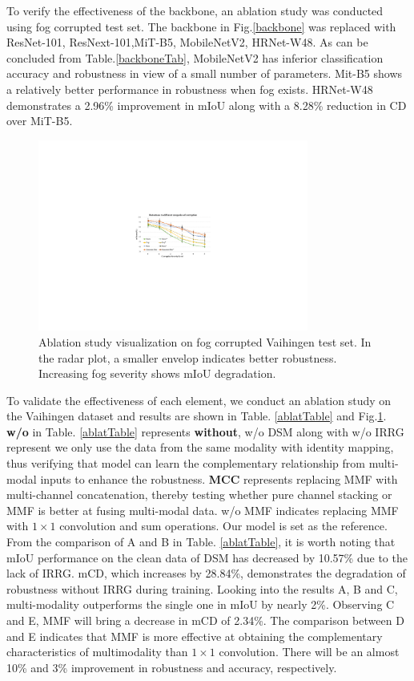 \documentclass[lettersize,journal]{IEEEtran}
\begin{document}
  To verify the effectiveness of the backbone, an ablation study was conducted using fog corrupted test set. The backbone in Fig.\ref{backbone} was replaced with ResNet-101, ResNext-101,MiT-B5\cite{xieSegFormerSimpleEfficient2021}, MobileNetV2\cite{sandlerMobileNetV2InvertedResiduals2019a}, HRNet-W48\cite{wangDeepHighResolutionRepresentation2020}. As can be concluded from Table.\ref{backboneTab}, MobileNetV2 has inferior classification accuracy and robustness  in view of a small number of parameters. Mit-B5 shows a relatively better performance in robustness when fog exists. HRNet-W48 demonstrates a 2.96\% improvement in mIoU along with a 8.28\% reduction in CD over MiT-B5.
  \begin{figure}[!htbp]
    \centering
    \includegraphics[width=3.5in]{dataPlot2}
    \caption{Ablation study visualization on fog corrupted Vaihingen test set. In the radar plot, a smaller envelop indicates better robustness. Increasing fog severity shows mIoU degradation.}
    \label{dataPlot}
    \vspace{-0.5cm}  
    \end{figure}

To validate the effectiveness of each element, we conduct an ablation study on the Vaihingen dataset and results are shown in Table. \ref{ablatTable} and Fig.\ref{dataPlot}. \textbf{w/o} in Table. \ref{ablatTable} represents \textbf{without}, w/o DSM along with w/o IRRG represent we only use the data from the same modality with identity mapping, thus verifying that model can learn the complementary relationship from multi-modal inputs to enhance the robustness. \textbf{MCC} represents replacing MMF with multi-channel concatenation, thereby testing whether pure channel stacking or MMF is better at fusing multi-modal data. w/o MMF indicates replacing  MMF with $1\times 1$ convolution and sum operations. Our model is set as the reference. From the comparison of A and B in Table. \ref{ablatTable}, it is worth noting that mIoU performance on the clean data of DSM has decreased by 10.57\% due to the lack of IRRG. mCD, which increases by 28.84\%, demonstrates the degradation of robustness without IRRG during training. Looking into the results A, B and C, multi-modality outperforms the single one in mIoU by nearly 2\%. Observing C and E, MMF will bring a decrease in mCD of 2.34\%. The comparison between D and E indicates that MMF is more effective at obtaining the complementary characteristics of multimodality than $1\times 1$ convolution. There will be an almost 10\% and 3\% improvement in robustness and accuracy, respectively. 
\end{document}
